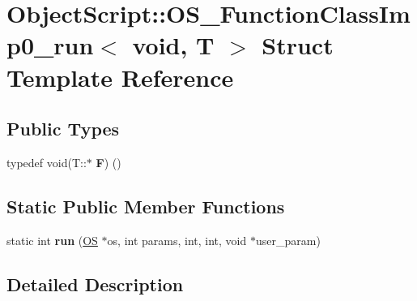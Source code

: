 \hypertarget{struct_object_script_1_1_o_s___function_class_imp0__run_3_01void_00_01_t_01_01_01_01_01_01_01_015b4d7cdba11c1d342b8aa91b9fbc3923}{}\section{Object\+Script\+:\+:O\+S\+\_\+\+Function\+Class\+Imp0\+\_\+run$<$ void, T $>$ Struct Template Reference}
\label{struct_object_script_1_1_o_s___function_class_imp0__run_3_01void_00_01_t_01_01_01_01_01_01_01_015b4d7cdba11c1d342b8aa91b9fbc3923}
\subsection*{Public Types}
\begin{DoxyCompactItemize}
\item 
typedef void(T\+::$\ast$ {\bfseries F}) ()\hypertarget{struct_object_script_1_1_o_s___function_class_imp0__run_3_01void_00_01_t_01_01_01_01_01_01_01_015b4d7cdba11c1d342b8aa91b9fbc3923_a6712504dcc4ec88481b2d88344d828ea}{}\label{struct_object_script_1_1_o_s___function_class_imp0__run_3_01void_00_01_t_01_01_01_01_01_01_01_015b4d7cdba11c1d342b8aa91b9fbc3923_a6712504dcc4ec88481b2d88344d828ea}

\end{DoxyCompactItemize}
\subsection*{Static Public Member Functions}
\begin{DoxyCompactItemize}
\item 
static int {\bfseries run} (\hyperlink{class_object_script_1_1_o_s}{OS} $\ast$os, int params, int, int, void $\ast$user\+\_\+param)\hypertarget{struct_object_script_1_1_o_s___function_class_imp0__run_3_01void_00_01_t_01_01_01_01_01_01_01_015b4d7cdba11c1d342b8aa91b9fbc3923_a38512a67f487c881908ec76f0f02f110}{}\label{struct_object_script_1_1_o_s___function_class_imp0__run_3_01void_00_01_t_01_01_01_01_01_01_01_015b4d7cdba11c1d342b8aa91b9fbc3923_a38512a67f487c881908ec76f0f02f110}

\end{DoxyCompactItemize}


\subsection{Detailed Description}
